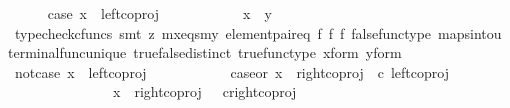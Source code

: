 \begin{isabellebody}
\ \ \ \ \isamarkupfalse%
\ case{}{\isacharcolon}{\kern0pt}\ {\isachardoublequoteopen}x\ {\isacharequal}{\kern0pt}\ left{\isacharunderscore}{\kern0pt}coproj\ {\isasymone}\ {\isacharparenleft}{\kern0pt}{\isasymone}\ {\isasymCoprod}\ {\isasymone}{\isacharparenright}{\kern0pt}{\isachardoublequoteclose}\isanewline
\ \ \ \ \isamarkupfalse%
\ \isamarkupfalse%
\ {\isachardoublequoteopen}x\ {\isacharequal}{\kern0pt}\ y{\isachardoublequoteclose}\isanewline
\ \ \ \ \ \ \isamarkupfalse%
\ {\isacharparenleft}{\kern0pt}typecheck{\isacharunderscore}{\kern0pt}cfuncs{\isacharcomma}{\kern0pt}\ smt\ {\isacharparenleft}{\kern0pt}z{}{\isacharparenright}{\kern0pt}\ mx{\isacharunderscore}{\kern0pt}eqs{\isacharunderscore}{\kern0pt}my\ element{\isacharunderscore}{\kern0pt}pair{\isacharunderscore}{\kern0pt}eq\ f{}\ f{}\ f{}\ false{\isacharunderscore}{\kern0pt}func{\isacharunderscore}{\kern0pt}type\ maps{\isacharunderscore}{\kern0pt}into{\isacharunderscore}{\kern0pt}{}u{}\ terminal{\isacharunderscore}{\kern0pt}func{\isacharunderscore}{\kern0pt}unique\ true{\isacharunderscore}{\kern0pt}false{\isacharunderscore}{\kern0pt}distinct\ true{\isacharunderscore}{\kern0pt}func{\isacharunderscore}{\kern0pt}type\ x{\isacharunderscore}{\kern0pt}form\ y{\isacharunderscore}{\kern0pt}form{\isacharparenright}{\kern0pt}\isanewline
\ \ \isamarkupfalse%
\isanewline
\ \ \ \ \isamarkupfalse%
\ not{\isacharunderscore}{\kern0pt}case{}{\isacharcolon}{\kern0pt}\ {\isachardoublequoteopen}x\ {\isasymnoteq}\ left{\isacharunderscore}{\kern0pt}coproj\ {\isasymone}\ {\isacharparenleft}{\kern0pt}{\isasymone}\ {\isasymCoprod}\ {\isasymone}{\isacharparenright}{\kern0pt}{\isachardoublequoteclose}\isanewline
\ \ \ \ \isamarkupfalse%
\ \isamarkupfalse%
\ case{}{\isacharunderscore}{\kern0pt}or{\isacharunderscore}{\kern0pt}{}{\isacharcolon}{\kern0pt}\ {\isachardoublequoteopen}x\ {\isacharequal}{\kern0pt}\ {\isacharparenleft}{\kern0pt}right{\isacharunderscore}{\kern0pt}coproj\ {\isasymone}\ {\isacharparenleft}{\kern0pt}{\isasymone}{\isasymCoprod}{\isasymone}{\isacharparenright}{\kern0pt}{\isasymcirc}\isactrlsub c\ left{\isacharunderscore}{\kern0pt}coproj\ {\isasymone}\ {\isasymone}{\isacharparenright}{\kern0pt}{\isasymor}\ \isanewline
\ \ \ \ \ \ \ \ \ \ \ \ \ \ \ x\ {\isacharequal}{\kern0pt}\ right{\isacharunderscore}{\kern0pt}coproj\ {\isasymone}\ {\isacharparenleft}{\kern0pt}{\isasymone}{\isasymCoprod}{\isasymone}{\isacharparenright}{\kern0pt}\ {\isasymcirc}\isactrlsub c{\isacharparenleft}{\kern0pt}right{\isacharunderscore}{\kern0pt}coproj\ {\isasymone}\ {\isasymone}{\isacharparenright}{\kern0pt}{\isachardoublequoteclose}\isanewline

\end{isabellebody}
